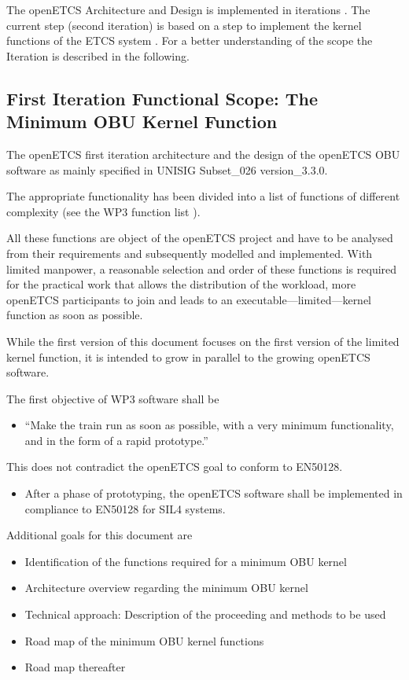 \documentclass{template/openetcs_report}
\begin{document}
The openETCS Architecture and Design is implemented in iterations \cite{deployment}. The current step (second iteration) is based on a step to implement the kernel functions of the ETCS system \cite{firstIteration}. For a better understanding of the scope the Iteration is described in the following.

\subsection{First Iteration Functional Scope: The Minimum OBU Kernel Function}
\label{sec:FunctionalScopeTheMinimumOBUKernelFunction}

The openETCS first iteration architecture and the design of the openETCS OBU software as mainly specified in \cite{subset-026} UNISIG Subset\_026 version\_3.3.0. 

The appropriate functionality has been divided into a list of functions of different complexity (see the WP3 function list \cite{functions}).

All these functions are object of the openETCS project and have to be analysed from their requirements and subsequently modelled and implemented. With limited manpower, a reasonable selection and order of these functions is required for the practical work that allows the distribution of the workload, more openETCS participants to join and leads to an executable---limited---kernel function as soon as possible. 

While the first version of this document focuses on the first version of the limited kernel function, it is intended to grow in parallel to the growing openETCS software.

The first objective of WP3 software shall be
\begin{itemize}
	\item ``Make the train run as soon as possible, with a very minimum functionality, and in the form of a rapid prototype.''
\end{itemize}
This does not contradict the openETCS goal to conform to EN50128.
\begin{itemize}
	\item After a phase of prototyping, the openETCS software shall be implemented in compliance to EN50128 for SIL4 systems.
\end{itemize}
Additional goals for this document are
\begin{itemize}
	\item Identification of the functions required for a minimum OBU kernel
	\item Architecture overview regarding the minimum OBU kernel
	\item Technical approach: Description of the proceeding and methods to be used
	\item Road map of the minimum OBU kernel functions
	\item Road map thereafter
\end{itemize}
\end{document}
